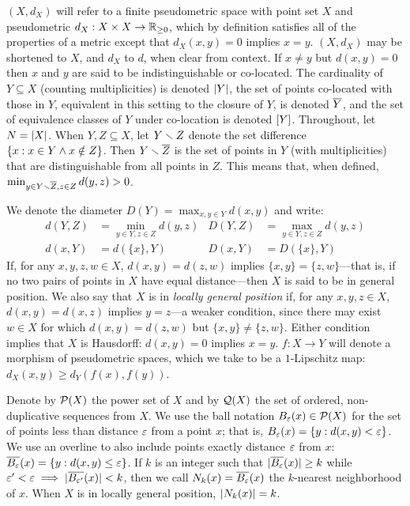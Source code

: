 \documentclass{article}
\begin{document}
\((X, d_X)\) will refer to a finite pseudometric space with point set
\(X\) and pseudometric \(d_X:X\times X\to\mathbb{R}_{\geq 0}\), which by
definition satisfies all of the properties of a metric except that
\(d_X(x,y)=0\) implies \(x=y\). \((X,d_X)\) may be shortened to \(X\),
and \(d_X\) to \(d\), when clear from context. If \(x\neq y\) but
\(d(x,y)=0\) then \(x\) and \(y\) are said to be indistinguishable or
co-located. The cardinality of \(Y\subseteq X\) (counting
multiplicities) is denoted \(\lvert Y\rvert\), the set of points co-located
with those in \(Y\), equivalent in this setting to the closure of \(Y\),
is denoted \(\overline{Y}\), and the set of equivalence classes of \(Y\) under
co-location is denoted \([Y]\). Throughout, let \(N=\lvert X\rvert\). When
\(Y,Z\subseteq X\), let \(Y\smallsetminus Z\) denote the set difference
\(\{x : x \in Y \wedge x \notin Z\}\). Then \(Y \smallsetminus \overline{Z}\) is the
set of points in \(Y\) (with multiplicities) that are distinguishable
from all points in \(Z\). This means that, when defined,
\(\min_{y\in Y\smallsetminus \overline{Z},z\in Z}{d(y, z)}>0\).

We denote the diameter \(D(Y)=\max_{x,y\in Y}{d(x,y)}\) and write:
\begin{align*}
d(Y,Z) &= \min_{y\in Y,z\in Z}{d(y,z)} & D(Y,Z) &= \max_{y\in Y,z\in Z}{d(y,z)} \\
d(x,Y) &= d(\{x\},Y)                   & D(x,Y) &= D(\{x\},Y)
\end{align*} If, for any \(x,y,z,w \in X\), \(d(x,y)=d(z,w)\) implies
\(\{x,y\}=\{z,w\}\)---that is, if no two pairs of points in \(X\) have
equal distance---then \(X\) is said to be in general position. We also
say that \(X\) is in \emph{locally general position} if, for any
\(x,y,z \in X\), \(d(x,y)=d(x,z)\) implies \(y=z\)---a weaker condition,
since there may exist \(w \in X\) for which \(d(x,y)=d(z,w)\) but
\(\{x,y\}\neq\{z,w\}\). Either condition implies that \(X\) is
Hausdorff: \(d(x,y)=0\) implies \(x=y\). \(f:X \to Y\) will denote a
morphism of pseudometric spaces, which we take to be a \(1\)-Lipschitz
map: \(d_X(x,y)\geq d_Y(f(x),f(y))\).

Denote by \(\mathcal{P}(X)\) the power set of \(X\) and by \(\mathcal{Q}(X)\) the
set of ordered, non-duplicative sequences from \(X\). We use the ball
notation \(B_{\varepsilon}(x) \in \mathcal{P}(X)\) for the set of points less than
distance \(\varepsilon\) from a point \(x\); that is,
\(B_{\varepsilon}(x) = \{ y : d(x,y) < \varepsilon \}\). We use an overline to
also include points exactly distance \(\varepsilon\) from \(x\):
\(\overline{B_{\varepsilon}}(x) = \{ y : d(x,y) \leq \varepsilon \}\). If \(k\) is an
integer such that \(\lvert \overline{B_\varepsilon}(x)\rvert \geq k\) while
\(\varepsilon'<\varepsilon \implies \lvert \overline{B_{\varepsilon'}}(x)\rvert < k\), then we call
\(N_k(x) = \overline{B_\varepsilon}(x)\) the \(k\)-nearest neighborhood of \(x\).
When \(X\) is in locally general position, \(\lvert N_k(x)\rvert = k\).
\end{document}
